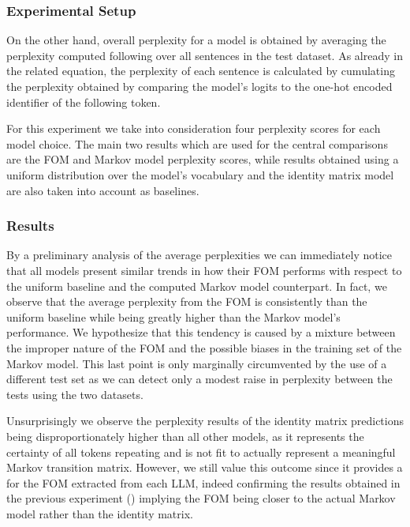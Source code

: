 \subsubsection{Experimental Setup}


On the other hand, overall perplexity for a model is obtained by averaging the perplexity computed following  over all sentences  in the test dataset.
As already  in the related equation, the perplexity of each sentence is calculated by cumulating  the perplexity obtained by comparing the model's  logits to the one-hot encoded identifier of the following token.

For this experiment we take into consideration four perplexity scores for each model choice.
The main two results which are used for the central comparisons are the FOM and Markov model perplexity scores, while results obtained using a uniform distribution over the model's vocabulary and the identity matrix model are also taken into account as baselines.

\subsubsection{Results}

By a preliminary analysis of the average perplexities we can immediately notice that all models present similar trends in how their FOM performs with respect to the uniform baseline and the computed Markov model counterpart.
In fact, we observe that the average perplexity from the FOM is consistently  than the uniform baseline while being greatly higher than the Markov model's performance.
We hypothesize that this tendency is caused by a mixture between the improper nature of the FOM and the possible biases in the training set of the Markov model.
This last point is only marginally circumvented by the use of a different test set as we can detect only a modest raise in perplexity between the tests using the two datasets.

Unsurprisingly we observe the perplexity results of the identity matrix predictions being disproportionately higher than all other models, as it represents the certainty of all tokens repeating and is not fit to actually represent a meaningful Markov transition matrix.
However, we still value this outcome since it provides a  for the FOM extracted from each LLM, indeed confirming the results obtained in the previous experiment () implying the FOM being closer to the actual Markov model rather than the identity matrix.

